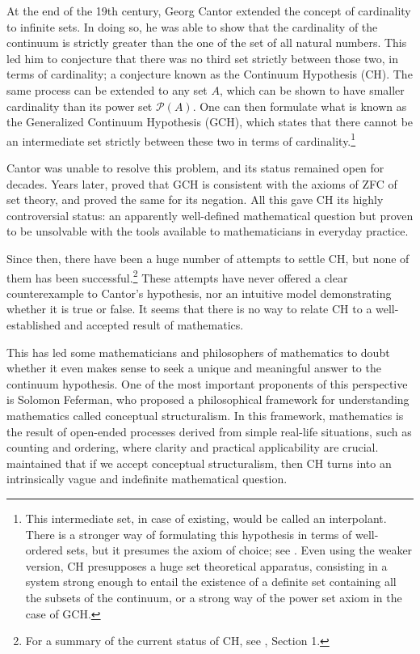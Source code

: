 \documentclass[11pt,a4paper]{book}
\theoremstyle{plain}
\begin{document}
At the end of the 19th century, Georg Cantor extended the concept of cardinality to infinite sets. In doing so, he was able to show that the cardinality of the continuum is strictly greater than the one of the set of all natural numbers. This led him to conjecture that there was no third set strictly between those two, in terms of cardinality; a conjecture known as the Continuum Hypothesis (CH). The same process can be extended to any set $A$, which can be shown to have smaller cardinality than its power set $\mathcal{P}(A)$. One can then formulate what is known as the Generalized Continuum Hypothesis (GCH), which states that there cannot be an intermediate set strictly between these two in terms of cardinality.\footnote{This intermediate set, in case of existing, would be called an interpolant. There is a stronger way of formulating this hypothesis in terms of well-ordered sets, but it presumes the axiom of choice; see \textcite{Koellner2023}. Even using the weaker version, CH presupposes a huge set theoretical apparatus, consisting in a system strong enough to entail the existence of a definite set containing all the subsets of the continuum, or a strong way of the power set axiom in the case of GCH.}

Cantor was unable to resolve this problem, and its status remained open for decades. Years later, \textcite{Godel1940} proved that GCH is consistent with the axioms of ZFC of set theory, and \textcite{Cohen1966} proved the same for its negation. All this gave CH its highly controversial status: an apparently well-defined mathematical question but proven to be unsolvable with the tools available to mathematicians in everyday practice.

Since then, there have been a huge number of attempts to settle CH, but none of them has been successful.\footnote{For a summary of the current status of CH, see \textcite{Feferman2011a}, Section 1. } These attempts have never offered a clear counterexample to Cantor's hypothesis, nor an intuitive model demonstrating whether it is true or false. It seems that there is no way to relate CH to a well-established and accepted result of mathematics.

This has led some mathematicians and philosophers of mathematics to doubt whether it even makes sense to seek a unique and meaningful answer to the continuum hypothesis. One of the most important proponents of this perspective is Solomon Feferman, who proposed a philosophical framework for understanding mathematics called conceptual structuralism. In this framework, mathematics is the result of open-ended processes derived from simple real-life situations, such as counting and ordering, where clarity and practical applicability are crucial. \textcite{Feferman2011a} maintained that if we accept conceptual structuralism, then CH turns into an intrinsically vague and indefinite mathematical question.
\end{document}
